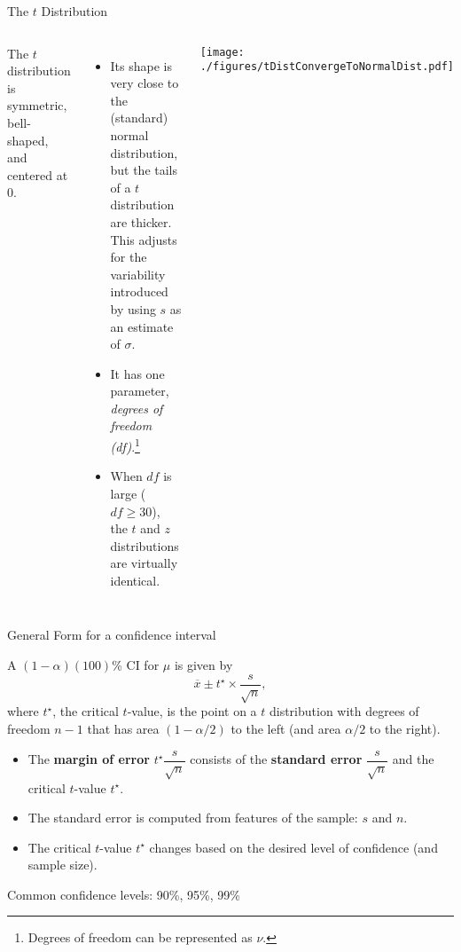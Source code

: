 \documentclass[
  ignorenonframetext,
  aspectratio=169]{beamer}
\newcommand{\columnsbegin}{\begin{columns}}
\newcommand{\columnsend}{\end{columns}}
\begin{document}
\begin{frame}{The \(t\) Distribution}
\protect\hypertarget{the-t-distribution}{}
\columnsbegin


\footnotesize

The \(t\) distribution is symmetric, bell-shaped, and centered at 0.

\begin{itemize}
\item
  Its shape is very close to the (standard) normal distribution, but the
  tails of a \(t\) distribution are thicker. This adjusts for the
  variability introduced by using \(s\) as an estimate of \(\sigma\).
\item
  It has one parameter, \emph{degrees of freedom
  (df)}.\footnote{Degrees of freedom can be represented as $\nu$.}
\item
  When \(df\) is large (\(df \geq 30\)), the \(t\) and \(z\)
  distributions are virtually identical.
\end{itemize}


\centering

\texttt{[image: ./figures/tDistConvergeToNormalDist.pdf]}

\columnsend
\end{frame}

\begin{frame}{General Form for a confidence interval}
\protect\hypertarget{general-form-for-a-confidence-interval}{}
\small

A \((1 - \alpha)(100)\)\% CI for \(\mu\) is given by
\[\overline{x} \pm t^\star \times \dfrac{s}{\sqrt{n}}, \] where
\(t^\star\), the critical \(t\)-value, is the point on a \(t\)
distribution with degrees of freedom \(n-1\) that has area
\((1 - \alpha/2)\) to the left (and area \(\alpha/2\) to the right).

\begin{itemize}
\item
  The \textbf{margin of error} \(t^\star \dfrac{s}{\sqrt{n}}\) consists
  of the \textbf{standard error} \(\dfrac{s}{\sqrt{n}}\) and the
  critical \(t\)-value \(t^\star\).
\item
  The standard error is computed from features of the sample: \(s\) and
  \(n\).
\item
  The critical \(t\)-value \(t^\star\) changes based on the desired
  level of confidence (and sample size).
\end{itemize}

Common confidence levels: 90\%, 95\%, 99\%
\end{frame}
\end{document}
